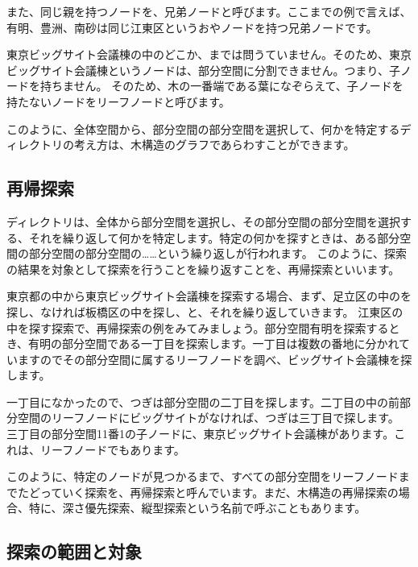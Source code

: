 また、同じ親を持つノードを、兄弟ノードと呼びます。ここまでの例で言えば、有明、豊洲、南砂は同じ江東区というおやノードを持つ兄弟ノードです。

東京ビッグサイト会議棟の中のどこか、までは問うていません。そのため、東京ビッグサイト会議棟というノードは、部分空間に分割できません。つまり、子ノードを持ちません。
そのため、木の一番端である葉になぞらえて、子ノードを持たないノードをリーフノードと呼びます。

このように、全体空間から、部分空間の部分空間を選択して、何かを特定するディレクトリの考え方は、木構造のグラフであらわすことができます。

\subsection{再帰探索}



ディレクトリは、全体から部分空間を選択し、その部分空間の部分空間を選択する、それを繰り返して何かを特定します。特定の何かを探すときは、ある部分空間の部分空間の部分空間の……という繰り返しが行われます。
このように、探索の結果を対象として探索を行うことを繰り返すことを、再帰探索といいます。

東京都の中から東京ビッグサイト会議棟を探索する場合、まず、足立区の中のを探し、なければ板橋区の中を探し、と、それを繰り返していきます。
江東区の中を探す探索で、再帰探索の例をみてみましょう。部分空間有明を探索するとき、有明の部分空間である一丁目を探索します。一丁目は複数の番地に分かれていますのでその部分空間に属するリーフノードを調べ、ビッグサイト会議棟を探します。

一丁目になかったので、つぎは部分空間の二丁目を探します。二丁目の中の前部分空間のリーフノードにビッグサイトがなければ、つぎは三丁目で探します。
三丁目の部分空間11番1の子ノードに、東京ビッグサイト会議棟があります。これは、リーフノードでもあります。

このように、特定のノードが見つかるまで、すべての部分空間をリーフノードまでたどっていく探索を、再帰探索と呼んでいます。まだ、木構造の再帰探索の場合、特に、深さ優先探索、縦型探索という名前で呼ぶこともあります。


\subsection{探索の範囲と対象}

